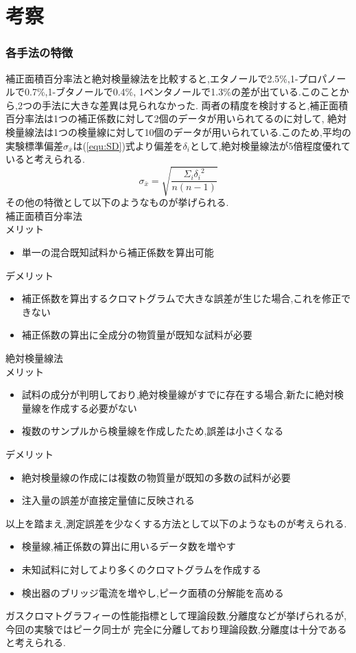 \section{考察}
\subsubsection{各手法の特徴}
補正面積百分率法と絶対検量線法を比較すると,エタノールで2.5\%,1-プロパノールで0.7\%,1-ブタノールで0.4\%,
1ペンタノールで1.3\%の差が出ている.このことから,2つの手法に大きな差異は見られなかった.
両者の精度を検討すると,補正面積百分率法は1つの補正係数に対して2個のデータが用いられてるのに対して,
絶対検量線法は1つの検量線に対して10個のデータが用いられている.このため,平均の実験標準偏差$\sigma_{\bar{x}}$は(\ref{equ:SD})式\cite{buturi}より偏差を$\delta_i$として,絶対検量線法が5倍程度優れていると考えられる.
\begin{equation}
  \label{equ:SD}
  \sigma_{\bar{x}}=\sqrt{\frac{{\Sigma_i {}\delta_i}^2}{n(n-1)}}
\end{equation}
その他の特徴として以下のようなものが挙げられる.\\
補正面積百分率法\\メリット
\begin{itemize}
  \item 単一の混合既知試料から補正係数を算出可能
\end{itemize}
デメリット
\begin{itemize}
  \item 補正係数を算出するクロマトグラムで大きな誤差が生じた場合,これを修正できない
  \item 補正係数の算出に全成分の物質量が既知な試料が必要
\end{itemize}
絶対検量線法\\メリット
\begin{itemize}
  \item 試料の成分が判明しており,絶対検量線がすでに存在する場合,新たに絶対検量線を作成する必要がない
  \item 複数のサンプルから検量線を作成したため,誤差は小さくなる
\end{itemize}
デメリット
\begin{itemize}
  \item 絶対検量線の作成には複数の物質量が既知の多数の試料が必要
  \item 注入量の誤差が直接定量値に反映される
\end{itemize}
以上を踏まえ,測定誤差を少なくする方法として以下のようなものが考えられる.
\begin{itemize}
  \item 検量線,補正係数の算出に用いるデータ数を増やす
  \item 未知試料に対してより多くのクロマトグラムを作成する
  \item 検出器のブリッジ電流を増やし,ピーク面積の分解能を高める
\end{itemize}
ガスクロマトグラフィーの性能指標として理論段数,分離度などが挙げられる\cite{BN00380381}が,今回の実験ではピーク同士が
完全に分離しており理論段数,分離度は十分であると考えられる.
